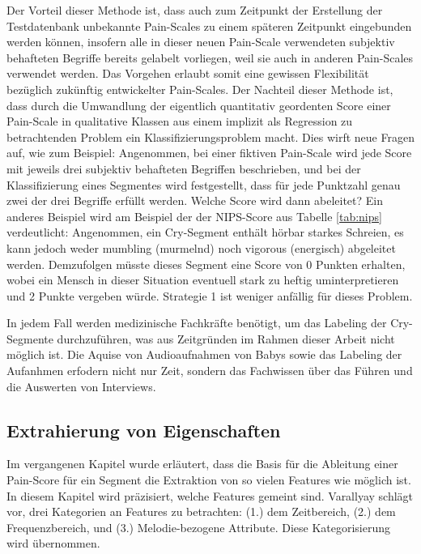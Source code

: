 Der Vorteil dieser Methode ist, dass auch zum Zeitpunkt der Erstellung der Testdatenbank unbekannte Pain-Scales zu einem späteren Zeitpunkt eingebunden werden können, insofern alle in dieser neuen Pain-Scale verwendeten subjektiv behafteten Begriffe bereits gelabelt vorliegen, weil sie auch in anderen Pain-Scales verwendet werden. Das Vorgehen erlaubt somit eine gewissen Flexibilität bezüglich zukünftig entwickelter Pain-Scales. Der Nachteil dieser Methode ist, dass durch die Umwandlung der eigentlich quantitativ geordenten Score einer Pain-Scale in qualitative Klassen aus einem implizit als Regression zu betrachtenden Problem ein Klassifizierungsproblem macht. Dies wirft neue Fragen auf, wie zum Beispiel: Angenommen, bei einer fiktiven Pain-Scale wird jede Score mit jeweils drei subjektiv behafteten Begriffen beschrieben, und bei der Klassifizierung eines Segmentes wird festgestellt, dass für jede Punktzahl genau zwei der drei Begriffe erfüllt werden. Welche Score wird dann abeleitet? Ein anderes Beispiel wird am Beispiel der der NIPS-Score aus Tabelle \ref{tab:nips} verdeutlicht: Angenommen, ein Cry-Segment enthält hörbar \glqq starkes\grqq{} Schreien, es kann jedoch weder \glqq mumbling (murmelnd) \grqq{} noch \glqq vigorous (energisch)\grqq{} abgeleitet werden. Demzufolgen müsste dieses Segment eine Score von 0 Punkten erhalten, wobei ein Mensch in dieser Situation eventuell \glqq stark\grqq{} zu \glqq heftig\grqq{} uminterpretieren und 2 Punkte vergeben würde.  Strategie 1 ist weniger anfällig für dieses Problem.

In jedem Fall werden medizinische Fachkräfte benötigt, um das Labeling der Cry-Segmente durchzuführen, was aus Zeitgründen im Rahmen dieser Arbeit nicht möglich ist. Die Aquise von Audioaufnahmen von Babys sowie das Labeling der Aufanhmen erfodern nicht nur Zeit, sondern das Fachwissen über das Führen und die Auswerten von Interviews.

\subsection{Extrahierung von Eigenschaften}
\label{sec:segmentFeatures}

Im vergangenen Kapitel wurde erläutert, dass die Basis für die Ableitung einer Pain-Score für ein Segment die Extraktion von \glqq so vielen Features wie möglich\grqq{} ist. In diesem Kapitel wird präzisiert, welche Features gemeint sind.  Varallyay \cite[S. 16 - 17]{cry_thesis} schlägt vor, drei Kategorien an Features zu betrachten: (1.) dem Zeitbereich, (2.) dem Frequenzbereich, und (3.) Melodie-bezogene Attribute. Diese Kategorisierung wird übernommen.

